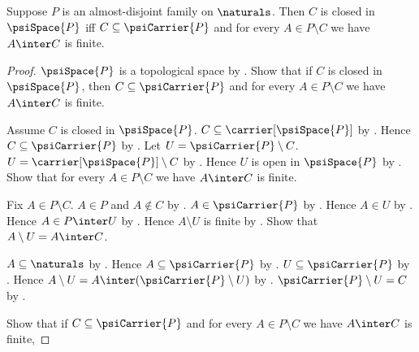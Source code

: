 \begin{theorem}\label{psi_closed_iff}
    Suppose $P$ is an almost-disjoint family on $\naturals$.
    Then $C$ is closed in $\psiSpace{P}$ iff
        $C\subseteq\psiCarrier{P}$ and
        for every $A\in P\setminus C$ we have $A\inter C$ is finite.
\end{theorem}
\begin{proof}
    $\psiSpace{P}$ is a topological space
        by .
    Show that if $C$ is closed in $\psiSpace{P}$, then
        $C\subseteq\psiCarrier{P}$ and
        for every $A\in P\setminus C$ we have $A\inter C$ is finite.
    \begin{subproof}
        Assume $C$ is closed in $\psiSpace{P}$.
        $C\subseteq\carrier[\psiSpace{P}]$
            by .
        Hence $C\subseteq\psiCarrier{P}$ by .
        Let $U=\psiCarrier{P}\setminus C$.
        $U=\carrier[\psiSpace{P}]\setminus C$
            by .
        Hence $U$ is open in $\psiSpace{P}$
            by .
        Show that for every $A\in P\setminus C$ we have
            $A\inter C$ is finite.
        \begin{subproof}
            Fix $A\in P\setminus C$.
            $A\in P$ and $A\notin C$ by .
            $A\in\psiCarrier{P}$
                by .
            Hence $A\in U$ by .
            Hence $A\in P\inter U$ by .
            Hence $A\setminus U$ is finite by .
            Show that $A\setminus U=A\inter C$.
            \begin{subproof}
                $A\subseteq\naturals$ by
                    .
                Hence $A\subseteq\psiCarrier{P}$ by
                    .
                $U\subseteq\psiCarrier{P}$ by .
                Hence $A\setminus U=
                    A\inter(\psiCarrier{P}\setminus U)$
                    by .
                $\psiCarrier{P}\setminus U=C$
                    by .
            \end{subproof}
        \end{subproof}
    \end{subproof}
    Show that if $C\subseteq\psiCarrier{P}$ and
        for every $A\in P\setminus C$ we have $A\inter C$ is finite,

\end{proof}
